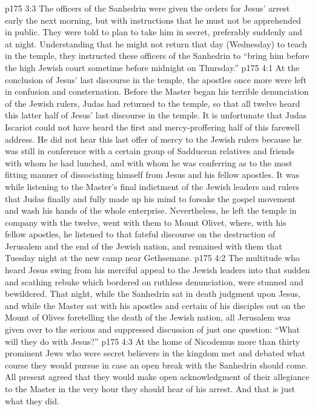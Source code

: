 \vs p175 3:3 The officers of the Sanhedrin were given the orders for Jesus’ arrest early the next morning, but with instructions that he must not be apprehended in public. They were told to plan to take him in secret, preferably suddenly and at night. Understanding that he might not return that day (Wednesday) to teach in the temple, they instructed these officers of the Sanhedrin to “bring him before the high Jewish court sometime before midnight on Thursday.”
\vs p175 4:1 At the conclusion of Jesus’ last discourse in the temple, the apostles once more were left in confusion and consternation. Before the Master began his terrible denunciation of the Jewish rulers, Judas had returned to the temple, so that all twelve heard this latter half of Jesus’ last discourse in the temple. It is unfortunate that Judas Iscariot could not have heard the first and mercy\hyp{}proffering half of this farewell address. He did not hear this last offer of mercy to the Jewish rulers because he was still in conference with a certain group of Sadducean relatives and friends with whom he had lunched, and with whom he was conferring as to the most fitting manner of dissociating himself from Jesus and his fellow apostles. It was while listening to the Master’s final indictment of the Jewish leaders and rulers that Judas finally and fully made up his mind to forsake the gospel movement and wash his hands of the whole enterprise. Nevertheless, he left the temple in company with the twelve, went with them to Mount Olivet, where, with his fellow apostles, he listened to that fateful discourse on the destruction of Jerusalem and the end of the Jewish nation, and remained with them that Tuesday night at the new camp near Gethsemane.
\pc \vs p175 4:2 The multitude who heard Jesus swing from his merciful appeal to the Jewish leaders into that sudden and scathing rebuke which bordered on ruthless denunciation, were stunned and bewildered. That night, while the Sanhedrin sat in death judgment upon Jesus, and while the Master sat with his apostles and certain of his disciples out on the Mount of Olives foretelling the death of the Jewish nation, all Jerusalem was given over to the serious and suppressed discussion of just one question: “What will they do with Jesus?”
\pc \vs p175 4:3 At the home of Nicodemus more than thirty prominent Jews who were secret believers in the kingdom met and debated what course they would pursue in case an open break with the Sanhedrin should come. All present agreed that they would make open acknowledgment of their allegiance to the Master in the very hour they should hear of his arrest. And that is just what they did.
